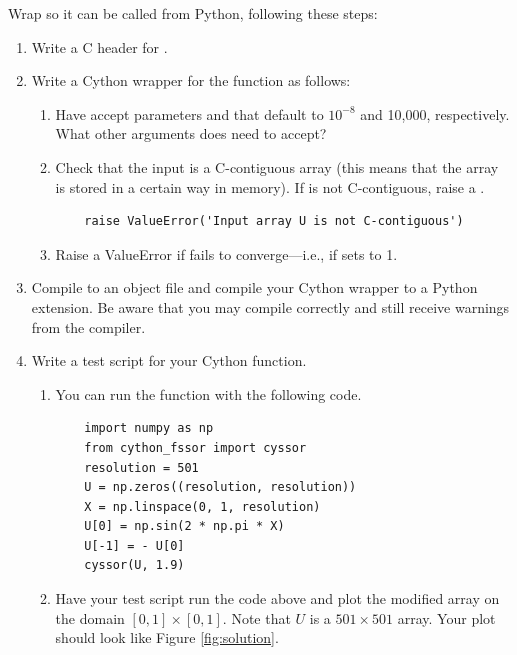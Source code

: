 \begin{problem}\label{prob:c_wrap}
Wrap  so it can be called from Python, following these steps:
\begin{enumerate}
\item Write a C header for .
\item Write a Cython wrapper  for the function  as follows:
    \begin{enumerate}
    \item Have  accept parameters  and  that default to $10^{-8}$ and 10,000, respectively.
    What other arguments does  need to accept?
    \item Check that the input  is a C-contiguous array (this means that the array is stored in a certain way in memory).
    If  is not C-contiguous, raise a .
    \begin{lstlisting}
    raise ValueError('Input array U is not C-contiguous')
    \end{lstlisting}
    \item Raise a ValueError if  fails to converge---i.e., if  sets  to 1.
    \end{enumerate}
\item Compile  to an object file and compile your Cython wrapper to a Python extension. 
Be aware that you may compile  correctly and still receive warnings from the compiler.
\item Write a test script for your Cython function.
    \begin{enumerate}
    \item You can run the function with the following code.
    \begin{lstlisting}
	import numpy as np
	from cython_fssor import cyssor
	resolution = 501
	U = np.zeros((resolution, resolution))
	X = np.linspace(0, 1, resolution)
	U[0] = np.sin(2 * np.pi * X)
	U[-1] = - U[0]
	cyssor(U, 1.9)
	\end{lstlisting}
    \item Have your test script run the code above and plot the modified array  on the domain $[0,1]\times[0, 1]$. 
    Note that $U$ is a $501\times 501$ array.
    Your plot should look like Figure \ref{fig:solution}.
    \end{enumerate}
\end{enumerate}


\end{problem}
